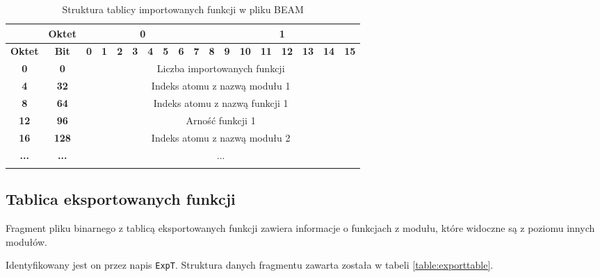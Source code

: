 \begin{longtable}{|c|c|c|c|c|c|c|c|c|c|c|c|c|c|c|c|c|c|}
\hline
         & \textbf{Oktet} & \multicolumn{8}{|c|}{\textbf{0}} & \multicolumn{8}{|c|}{\textbf{1}} \\
\hline
\textbf{Oktet} & \textbf{Bit} & \textbf{0} & \textbf{1} & \textbf{2} & \textbf{3} & \textbf{4} & \textbf{5} & \textbf{6} & \textbf{7} & \textbf{8} & \textbf{9} & \textbf{10} & \textbf{11} & \textbf{12} & \textbf{13} & \textbf{14} & \textbf{15}\\
\hline
\textbf{0} & \textbf{0} & \multicolumn{16}{|c|}{Liczba importowanych funkcji} \\[3ex]
\hline
\textbf{4} & \textbf{32} & \multicolumn{16}{|c|}{Indeks atomu z nazwą modułu 1}\\[3ex]
\hline
\textbf{8} & \textbf{64} & \multicolumn{16}{|c|}{Indeks atomu z nazwą funkcji 1} \\[3ex]
\hline
\textbf{12} & \textbf{96} & \multicolumn{16}{|c|}{Arność funkcji 1}\\[3ex]
\hline
\textbf{16} & \textbf{128} & \multicolumn{16}{|c|}{Indeks atomu z nazwą modułu 2}\\[3ex]
\hline
\textbf{...} & \textbf{...} & \multicolumn{16}{|c|}{...}  \\[3ex]
\hline
\caption{Struktura tablicy importowanych funkcji w pliku BEAM}
\label{table:importtable} \\
\end{longtable}

\subsection{Tablica eksportowanych funkcji}
Fragment pliku binarnego z tablicą eksportowanych funkcji zawiera informacje o funkcjach z modułu, które widoczne są z poziomu innych modułów.

Identyfikowany jest on przez napis \texttt{ExpT}. Struktura danych fragmentu zawarta została w tabeli \ref{table:exporttable}.

